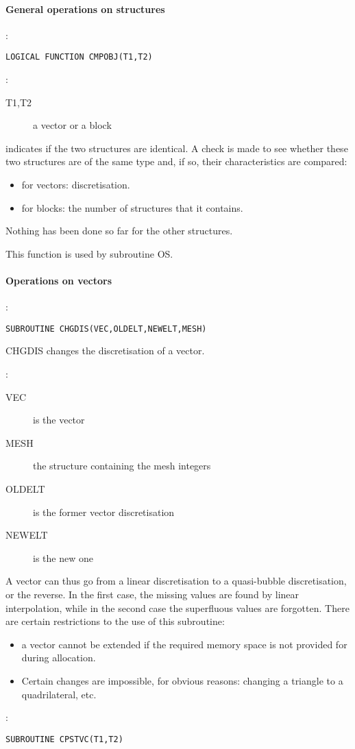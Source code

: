\paragraph{General operations on structures}

:
\begin{lstlisting}[language=TelFortran]
LOGICAL FUNCTION CMPOBJ(T1,T2)
\end{lstlisting}

:
\begin{description}
  \item [T1,T2]a vector or a block
\end{description}

 indicates if the two structures are identical. A check is made to see
whether these two structures are of the same type and, if so, their
characteristics are compared:
\begin{itemize}
  \item for vectors: discretisation.
  \item for blocks: the number of structures that it contains.
\end{itemize}

Nothing has been done so far for the other structures.

This function is used by subroutine OS.

\paragraph{Operations on vectors}

:
\begin{lstlisting}[language=TelFortran]
SUBROUTINE CHGDIS(VEC,OLDELT,NEWELT,MESH)
\end{lstlisting}

CHGDIS changes the discretisation of a vector.

:
\begin{description}
  \item [VEC] is the vector
  \item [MESH] the structure containing the mesh integers
  \item [OLDELT] is the former vector discretisation
  \item [NEWELT] is the new one
\end{description}
A vector can thus go from a linear discretisation to a quasi-bubble
discretisation, or the reverse. In the first case, the missing values are found
by linear interpolation, while in the second case the superfluous values are
forgotten. There are certain restrictions to the use of this subroutine:
\begin{itemize}
  \item a vector cannot be extended if the required memory space is not
    provided for during allocation.
  \item Certain changes are impossible, for obvious reasons: changing a
    triangle to a quadrilateral, etc.
\end{itemize}
:
\begin{lstlisting}[language=TelFortran]
SUBROUTINE CPSTVC(T1,T2)
\end{lstlisting}

